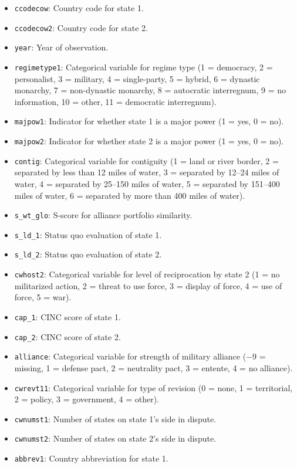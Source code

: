 \documentclass[12pt]{article}
\begin{document}
\begin{itemize}
  \item \texttt{ccodecow}: Country code for state 1.
  \item \texttt{ccodecow2}: Country code for state 2.
  \item \texttt{year}: Year of observation.
  \item \texttt{regimetype1}: Categorical variable for regime type (1 = democracy, 2 = personalist, 3 = military, 4 = single-party, 5 = hybrid, 6 = dynastic monarchy, 7 = non-dynastic monarchy, 8 = autocratic interregnum, 9 = no information, 10 = other, 11 = democratic interregnum).
  \item \texttt{majpow1}: Indicator for whether state 1 is a major power (1 = yes, 0 = no).
  \item \texttt{majpow2}: Indicator for whether state 2 is a major power (1 = yes, 0 = no).
  \item \texttt{contig}: Categorical variable for contiguity (1 = land or river border, 2 = separated by less than 12 miles of water, 3 = separated by 12--24 miles of water, 4 = separated by 25--150 miles of water, 5 = separated by 151--400 miles of water, 6 = separated by more than 400 miles of water).
  \item \texttt{s\_wt\_glo}: S-score for alliance portfolio similarity.
  \item \texttt{s\_ld\_1}: Status quo evaluation of state 1.
  \item \texttt{s\_ld\_2}: Status quo evaluation of state 2.
  \item \texttt{cwhost2}: Categorical variable for level of reciprocation by state 2 (1 = no militarized action, 2 = threat to use force, 3 = display of force, 4 = use of force, 5 = war).
  \item \texttt{cap\_1}: CINC score of state 1.
  \item \texttt{cap\_2}: CINC score of state 2. 
  \item \texttt{alliance}: Categorical variable for strength of military alliance ($-$9 = missing, 1 = defense pact, 2 = neutrality pact, 3 = entente, 4 = no alliance).
  \item \texttt{cwrevt11}: Categorical variable for type of revision (0 = none, 1 = territorial, 2 = policy, 3 = government, 4 = other).
  \item \texttt{cwnumst1}: Number of states on state 1's side in dispute.
  \item \texttt{cwnumst2}: Number of states on state 2's side in dispute.
  \item \texttt{abbrev1}: Country abbreviation for state 1.
\end{itemize}
\end{document}
